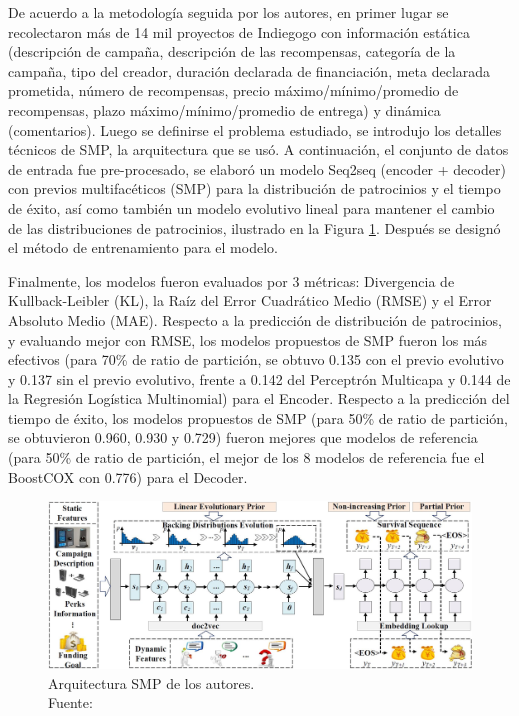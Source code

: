 De acuerdo a la metodología seguida por los autores, en primer lugar se recolectaron más de 14 mil proyectos de Indiegogo con información estática (descripción de campaña, descripción de las recompensas, categoría de la campaña, tipo del creador, duración declarada de financiación, meta declarada prometida, número de recompensas, precio máximo/mínimo/promedio de recompensas, plazo máximo/mínimo/promedio de entrega) y dinámica (comentarios). Luego se definirse el problema estudiado, se introdujo los detalles técnicos de SMP, la arquitectura que se usó. A continuación, el conjunto de datos de entrada fue pre-procesado, se elaboró un modelo Seq2seq (encoder + decoder) con previos multifacéticos (SMP) para la distribución de patrocinios y el tiempo de éxito, así como también un modelo evolutivo lineal para mantener el cambio de las distribuciones de patrocinios, ilustrado en la Figura \ref{2:fig124}. Después se designó el método de entrenamiento para el modelo.

Finalmente, los modelos fueron evaluados por 3 métricas: Divergencia de Kullback-Leibler (KL), la Raíz del Error Cuadrático Medio (RMSE) y el Error Absoluto Medio (MAE). Respecto a la predicción de distribución de patrocinios, y evaluando mejor con RMSE, los modelos propuestos de SMP fueron los más efectivos (para 70\% de ratio de partición, se obtuvo 0.135 con el previo evolutivo y 0.137 sin el previo evolutivo, frente a 0.142 del Perceptrón Multicapa y 0.144 de la Regresión Logística Multinomial) para el Encoder.
Respecto a la predicción del tiempo de éxito, los modelos propuestos de SMP (para 50\% de ratio de partición, se obtuvieron 0.960, 0.930 y 0.729) fueron mejores que modelos de referencia (para 50\% de ratio de partición, el mejor de los 8 modelos de referencia fue el BoostCOX con 0.776) para el Decoder.

\begin{figure}[!ht]
	\begin{center}
		\includegraphics[width=1\textwidth]{2/figures/jin2019.jpg}
		\caption[Arquitectura SMP de los autores]{Arquitectura SMP de los autores.\\
			Fuente: \cite{pr_jin2019dayssuccess}}
		\label{2:fig124}
	\end{center}
\end{figure}

